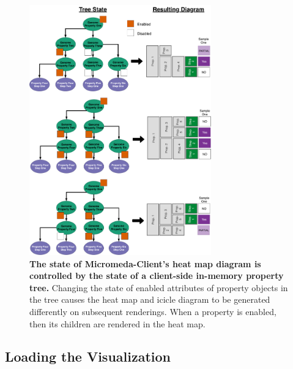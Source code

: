 \begin{figure}[!ht]
  \centering
	\includegraphics[width=0.7\textwidth]{media/how_tree_state_maps.pdf}
	 \caption[The state of Micromeda-Client's heat map diagram is controlled by the 
state of a client-side in-memory property tree.]{\textbf{The state of 
Micromeda-Client's heat map diagram is controlled by the state of a client-side 
in-memory property tree.} Changing the state of enabled attributes of property 
objects in the tree causes the heat map and icicle diagram to be generated 
differently on subsequent renderings. When a property is enabled, then its 
children are rendered in the heat map.}
	 \label{fig:tree-map-to-viz}
\end{figure}

\subsection{Loading the Visualization}


